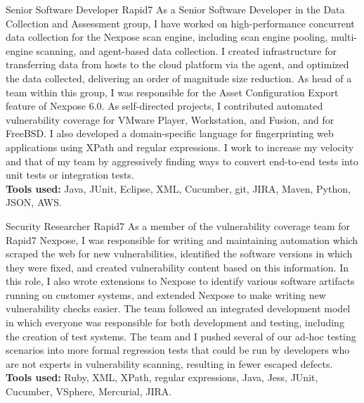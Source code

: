 \documentclass[11pt,letterpaper]{moderncv}
\begin{document}
{Senior Software Developer}
{Rapid7}
{}{}
{
As a Senior Software Developer in the Data Collection and Assessment group, I have worked on high-performance concurrent data collection for the Nexpose scan engine, including scan engine pooling, multi-engine scanning, and agent-based data collection. I created infrastructure for transferring data from hosts to the cloud platform via the agent, and optimized the data collected, delivering an order of magnitude size reduction. As head of a team within this group, I was responsible for the Asset Configuration Export feature of Nexpose 6.0. As self-directed projects, I contributed automated vulnerability coverage for VMware Player, Workstation, and Fusion, and for FreeBSD. I also developed a domain-specific language for fingerprinting web applications using XPath and regular expressions. I work to increase my velocity and that of my team by aggressively finding ways to convert end-to-end tests into unit tests or integration tests. \\
\textbf{Tools used:} Java, JUnit, Eclipse, XML, Cucumber, git, JIRA, Maven, Python, JSON, AWS.
}

\vspace*{0.2\baselineskip}
{Security Researcher}
{Rapid7}
{}{}
{
As a member of the vulnerability coverage team for Rapid7 Nexpose, I was responsible for writing and maintaining automation which scraped the web for new vulnerabilities, identified the software versions in which they were fixed, and created vulnerability content based on this information.  In this role, I also wrote extensions to Nexpose to identify various software artifacts running on customer systems, and extended Nexpose to make writing new vulnerability checks easier.  The team followed an integrated development model in which everyone was responsible for both development and testing, including the creation of test systems. The team and I pushed several of our ad-hoc testing scenarios into more formal regression tests that could be run by developers who are not experts in vulnerability scanning, resulting in fewer escaped defects. \\
\textbf{Tools used:} Ruby, XML, XPath, regular expressions, Java, Jess, JUnit, Cucumber, VSphere, Mercurial, JIRA.
}
\end{document}
